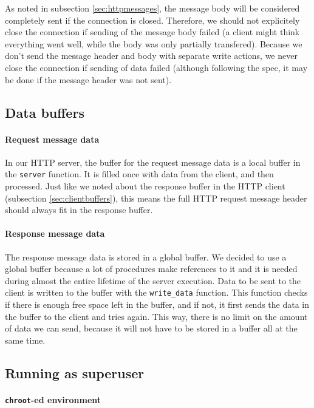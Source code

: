 \documentclass[11pt]{article}
\begin{document}
As noted in subsection \ref{sec:httpmessages}, the message body will be
considered completely sent if the connection is closed. Therefore, we should
not explicitely close the connection if sending of the message body
failed (a client might think everything went well, while the body was only
partially transfered). Because we don't send the message header and body with
separate write actions, we never close the connection if sending of data
failed (although following the spec, it may be done if the message header was
not sent).


\subsection{Data buffers}

\paragraph{Request message data}

In our HTTP server, the buffer for the request message data is a local buffer
in the \lstinline|server| function. It is filled once with data from the client,
and then processed. Just like we noted about the response buffer in the HTTP
client (subsection \ref{sec:clientbuffers}), this means the full HTTP request
message header should always fit in the response buffer.

\paragraph{Response message data}

The response message data is stored in a global buffer. We decided to use a
global buffer because a lot of procedures make references to it and it is needed
during almost the entire lifetime of the server execution. Data to be sent to
the client is written to the buffer with the \lstinline|write_data|
function. This function checks if there is enough free space left in the buffer,
and if not, it first sends the data in the buffer to the client and tries
again. This way, there is no limit on the amount of data we can send, because
it will not have to be stored in a buffer all at the same time.


\subsection{Running as superuser}

\paragraph{\lstinline|chroot|-ed environment}
\end{document}
